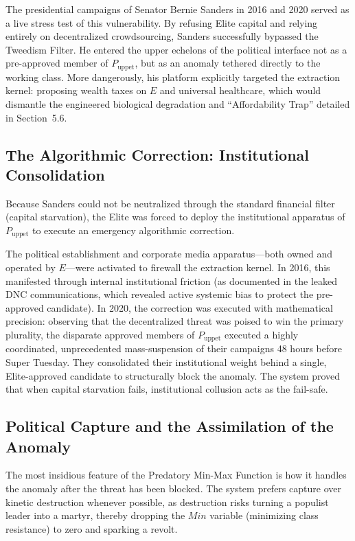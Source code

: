 \documentclass[12pt,openany]{book}
\begin{document}
The presidential campaigns of Senator Bernie Sanders in 2016 and 2020 served as a live stress test of this vulnerability. By refusing Elite capital and relying entirely on decentralized crowdsourcing, Sanders successfully bypassed the Tweedism Filter. He entered the upper echelons of the political interface not as a pre-approved member of $P_{\text{uppet}}$, but as an anomaly tethered directly to the working class. More dangerously, his platform explicitly targeted the extraction kernel: proposing wealth taxes on $E$ and universal healthcare, which would dismantle the engineered biological degradation and ``Affordability Trap'' detailed in Section~5.6.

\subsection{The Algorithmic Correction: Institutional Consolidation}

Because Sanders could not be neutralized through the standard financial filter (capital starvation), the Elite was forced to deploy the institutional apparatus of $P_{\text{uppet}}$ to execute an emergency algorithmic correction.

The political establishment and corporate media apparatus---both owned and operated by $E$---were activated to firewall the extraction kernel. In 2016, this manifested through internal institutional friction (as documented in the leaked DNC communications, which revealed active systemic bias to protect the pre-approved candidate). In 2020, the correction was executed with mathematical precision: observing that the decentralized threat was poised to win the primary plurality, the disparate approved members of $P_{\text{uppet}}$ executed a highly coordinated, unprecedented mass-suspension of their campaigns 48 hours before Super Tuesday. They consolidated their institutional weight behind a single, Elite-approved candidate to structurally block the anomaly. The system proved that when capital starvation fails, institutional collusion acts as the fail-safe.

\subsection{Political Capture and the Assimilation of the Anomaly}

The most insidious feature of the Predatory Min-Max Function is how it handles the anomaly after the threat has been blocked. The system prefers capture over kinetic destruction whenever possible, as destruction risks turning a populist leader into a martyr, thereby dropping the $Min$ variable (minimizing class resistance) to zero and sparking a revolt.
\end{document}

